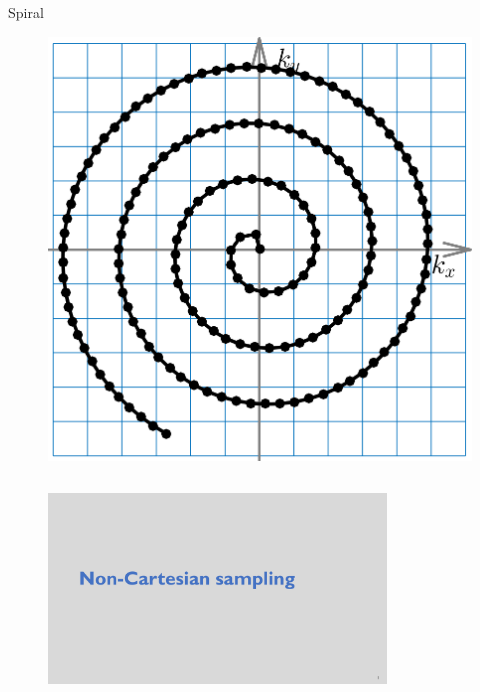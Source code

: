 \begin{frame}
\begin{columns}
		\begin{column}{0.35\textwidth}
			\centering
			Spiral
			\begin{figure}
				\includegraphics[width=\columnwidth]{fig/mri-trj-spiral.png}
			\end{figure}
		\end{column}
	\end{columns}
\end{frame}


\begin{frame}
    \begin{figure}
        \centering
        \includegraphics[page=3, width=0.8\textwidth]{fig/noncartesian_mri_overview.pdf}
    \end{figure}
\end{frame}



